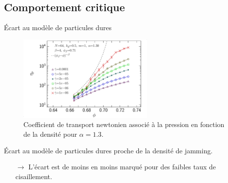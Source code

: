 \documentclass{beamer}
\begin{document}
\subsection{Comportement critique}

\begin{frame}{Écart au modèle de particules dures}

\begin{figure}[h!]
\centering
\includegraphics[width=0.6\textwidth]{figures/figs/etap-phi_0064_KDk500_Ml100_EL130}
\caption{Coefficient de transport newtonien associé à la pression en fonction de la densité pour $\alpha=1.3$.}
\end{figure}
\vspace{-10pt}
Écart au modèle de particules dures proche de la densité de jamming.
\begin{itemize}
\item[$\rightarrow$] L’écart est de moins en moins marqué pour des faibles taux de cisaillement.
\end{itemize}

\end{frame}
\end{document}
